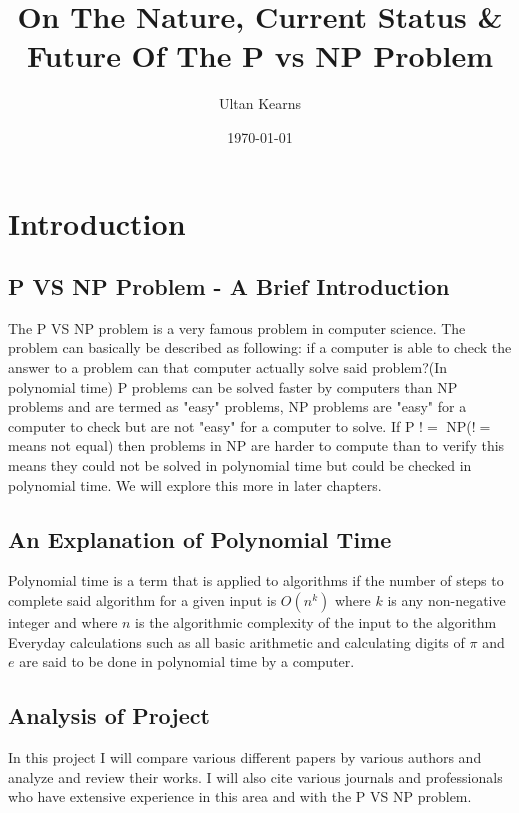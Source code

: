 \documentclass{report}
\title{On The Nature, Current Status \& Future Of The P vs NP Problem}
\author{Ultan Kearns}
\date{\today}
\begin{document}
\maketitle
\tableofcontents
\chapter{Introduction}
\section{P VS NP Problem - A Brief Introduction}
The P VS NP problem is a very famous problem in computer science.  The problem
can basically be described as following: if a computer is able to check the answer
to a problem can that computer actually solve said problem?(In polynomial time)\cite{pvsnpmit}  P problems can be
solved faster by computers than NP problems and are termed as "easy" problems, NP problems
are "easy" for a computer to check but are not "easy" for a computer to solve.\cite{pvsnpmit}
If P $!=$ NP($!=$ means not equal) then problems in NP are harder to compute than to verify
this means they could not be solved in polynomial time but could be checked in polynomial time.  We will explore this more in later chapters.
\section{An Explanation of Polynomial Time}
Polynomial time is a term that is applied to algorithms if the number of steps
to complete said algorithm for a given input is $O(n^k)$ where $k$ is any non-negative
integer and where $n$ is the algorithmic complexity of the input to the algorithm \cite{polynomial}
Everyday calculations such as all basic arithmetic and calculating digits of $\pi$ and $e$ are said
to be done in polynomial time by a computer\cite{polynomial}.
\section{Analysis of Project}
In this project I will compare various different papers by various authors and
analyze and review their works.  I will also cite various journals and professionals
who have extensive experience in this area and with the P VS NP problem.
\end{document}

